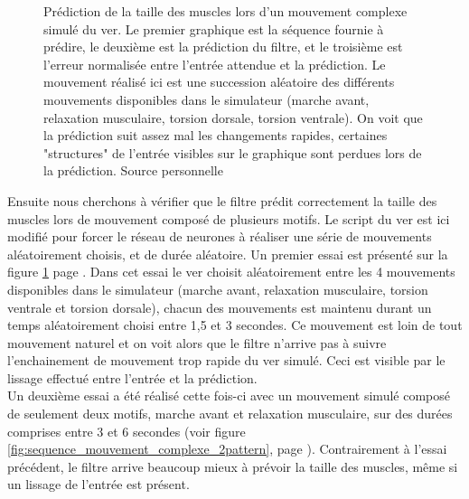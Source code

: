 \begin{figure}[ht]
   \begin{center}
   \end{center}
   \caption[Prédiction de la taille des muscles lors d'un mouvement complexe
   simulé]{Prédiction de la taille des muscles lors d'un mouvement complexe
   simulé du ver. Le premier graphique est la séquence fournie à prédire, le
   deuxième est la prédiction du filtre, et le troisième est l'erreur normalisée
   entre l'entrée attendue et la prédiction. Le mouvement réalisé ici est une
   succession aléatoire des différents mouvements disponibles dans le simulateur
   (marche avant, relaxation musculaire, torsion dorsale, torsion ventrale). On
   voit que la prédiction suit assez mal les changements rapides, certaines
   "structures" de l'entrée visibles sur le graphique sont perdues lors de la
   prédiction. Source personnelle}
   \label{fig:sequence_mouvement_complexe}
\end{figure}

Ensuite nous cherchons à vérifier que le filtre prédit correctement la taille
des muscles lors de mouvement composé de plusieurs motifs. Le script du ver est
ici modifié pour forcer le réseau de neurones à réaliser une série de mouvements
aléatoirement choisis, et de durée aléatoire. Un premier essai est présenté
sur la figure \ref{fig:sequence_mouvement_complexe} page
\pageref{fig:sequence_mouvement_complexe}.  Dans cet essai le ver choisit
aléatoirement entre les 4 mouvements disponibles dans le simulateur (marche
avant, relaxation musculaire, torsion ventrale et torsion dorsale), chacun des
mouvements est maintenu durant un temps aléatoirement choisi entre 1,5 et 3
secondes. Ce mouvement est loin de tout mouvement naturel et on voit alors que le
filtre n'arrive pas à suivre l'enchainement de mouvement trop rapide du ver
simulé. Ceci est visible par le lissage effectué entre l'entrée et la
prédiction.\\


Un deuxième essai a été réalisé cette fois-ci avec un mouvement simulé composé
de seulement deux motifs, marche avant et relaxation musculaire, sur des durées
comprises entre 3 et 6 secondes (voir figure
\ref{fig:sequence_mouvement_complexe_2pattern}, page
\pageref{fig:sequence_mouvement_complexe_2pattern}). Contrairement à l'essai
précédent, le filtre arrive beaucoup mieux à prévoir la taille des muscles, même
si un lissage de l'entrée est présent.

